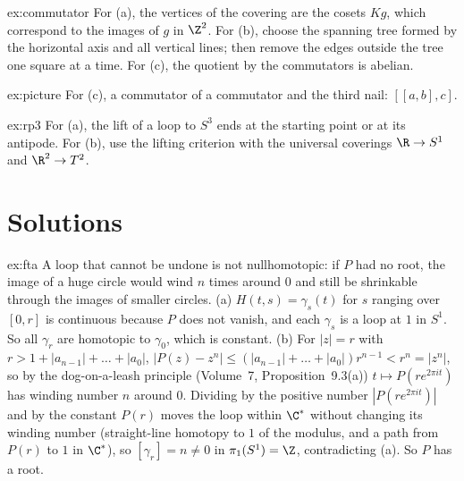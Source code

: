 \begin{hint}{ex:commutator}
For (a), the vertices of the covering are the cosets $Kg$, which correspond to the images of $g$ in $\Z^2$. For (b), choose the spanning tree formed by the horizontal axis and all vertical lines;
then remove the edges outside the tree one square at a time. For (c), the quotient by the commutators is abelian.
\end{hint}

\begin{hint}{ex:picture}
For (c), a commutator of a commutator and the third nail: $[[a,b],c]$.
\end{hint}

\begin{hint}{ex:rp3}
For (a), the lift of a loop to $S^3$ ends at the starting point or at its antipode. For (b), use the lifting criterion with the universal coverings $\R\to S^1$ and $\R^2\to T^2$.
\end{hint}

\section{Solutions}

\begin{solution}{ex:fta}
\idea A loop that cannot be undone is not nullhomotopic: if $P$ had no root, the image of a huge circle would wind $n$ times around $0$ and still be shrinkable through the images of smaller circles.
\writeup (a) $H(t,s)=\gamma_{s}(t)$ for $s$ ranging over $[0,r]$ is continuous because $P$ does not vanish, and each $\gamma_s$ is a loop at $1$ in $S^1$. So all $\gamma_r$ are homotopic to $\gamma_0$, which is constant.
(b) For $|z|=r$ with $r>1+|a_{n-1}|+\dots+|a_0|$, $|P(z)-z^n|\le(|a_{n-1}|+\dots+|a_0|)r^{n-1}<r^n=|z^n|$, so by the dog-on-a-leash principle (Volume~7, Proposition~9.3(a)) $t\mapsto P(re^{2\pi it})$ has winding
number $n$ around $0$. Dividing by the positive number $|P(re^{2\pi it})|$ and by the constant $P(r)$ moves the loop within $\C^*$ without changing its winding number (straight-line homotopy to
$1$ of the modulus, and a path from $P(r)$ to $1$ in $\C^*$), so $[\gamma_r]=n\ne0$ in $\pi_1(S^1)=\Z$, contradicting (a). So $P$ has a root.
\end{solution}

